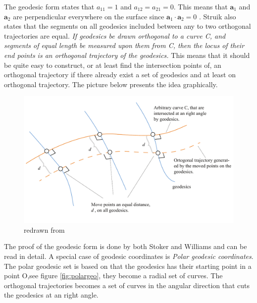 The geodesic form states that $a_{11} = 1$ and $a_{12}=a_{21} = 0$. This means that $\textbf{a}_1$ and $\textbf{a}_2$ are perpendicular everywhere on the surface since $\textbf{a}_1 \cdot \textbf{a}_2 = 0$ . 
Struik also states that the segments  on all geodesics included  between any to two orthogonal  trajectories are equal.
\textit{ If geodesics be drawn orthogonal to a curve C, and segments of equal length be measured upon them from C, then the locus of their end points is an orthogonal trajectory of the geodesics.} This means that it should be quite easy to construct, or at least find the intersection points of, an orthogonal trajectory if there already exist a set of geodesics and at least on orthogonal trajectory. The picture below presents the idea graphically.

\begin{figure}[H]
\centering
\includegraphics[width=1.0\linewidth ]{figure/Theory/geoDesicCoord2.pdf}
\caption{redrawn from \cite{ref:Struik}   }
\label{fig:geoCord}
\end{figure}

The proof of the geodesic form is done by both Stoker \cite{ref:Stoker} and Williams \cite{ref:Williams} and can be read in detail. A special case of geodesic coordinates is \textit{Polar geodesic coordinates}. The polar geodesic set is based on that the geodesics has their starting point in a point O,see figure \ref{fig:polargeo}, they become a radial set of curves. The orthogonal trajectories becomes a set of curves in the angular direction that cuts the geodesics at an right angle. 

